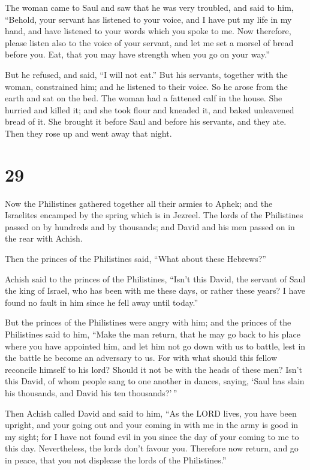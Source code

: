  The woman came to Saul and saw that he was very troubled,
and said to him, ``Behold, your servant has listened to your voice, and
I have put my life in my hand, and have listened to your words which you
spoke to me.  Now therefore, please listen also to the
voice of your servant, and let me set a morsel of bread before you. Eat,
that you may have strength when you go on your way.''

 But he refused, and said, ``I will not eat.'' But his
servants, together with the woman, constrained him; and he listened to
their voice. So he arose from the earth and sat on the bed.
 The woman had a fattened calf in the house. She hurried
and killed it; and she took flour and kneaded it, and baked unleavened
bread of it.  She brought it before Saul and before his
servants, and they ate. Then they rose up and went away that night.

\hypertarget{section-28}{%
\section{29}\label{section-28}}

 Now the Philistines gathered together all their armies to
Aphek; and the Israelites encamped by the spring which is in Jezreel.
 The lords of the Philistines passed on by hundreds and by
thousands; and David and his men passed on in the rear with Achish.

 Then the princes of the Philistines said, ``What about
these Hebrews?''

Achish said to the princes of the Philistines, ``Isn't this David, the
servant of Saul the king of Israel, who has been with me these days, or
rather these years? I have found no fault in him since he fell away
until today.''

 But the princes of the Philistines were angry with him; and
the princes of the Philistines said to him, ``Make the man return, that
he may go back to his place where you have appointed him, and let him
not go down with us to battle, lest in the battle he become an adversary
to us. For with what should this fellow reconcile himself to his lord?
Should it not be with the heads of these men?  Isn't this
David, of whom people sang to one another in dances, saying, `Saul has
slain his thousands, and David his ten thousands?'\,''

 Then Achish called David and said to him, ``As the LORD
lives, you have been upright, and your going out and your coming in with
me in the army is good in my sight; for I have not found evil in you
since the day of your coming to me to this day. Nevertheless, the lords
don't favour you.  Therefore now return, and go in peace,
that you not displease the lords of the Philistines.''

